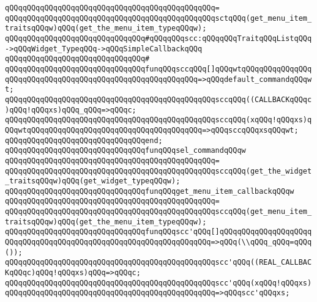 \verb|qQQqqQQqqQQqqQQqqQQqqQQqqQQqqQQqqQQqqQQqqQQqqQQq=|\newline
\verb|qQQqqQQqqQQqqQQqqQQqqQQqqQQqqQQqqQQqqQQqqQQqqQQqsctqQQq(get_menu_item_traitsqQQqw)qQQq(get_the_menu_item_typeqQQqw);|\newline
\newline
\verb|qQQqqQQqqQQqqQQqqQQqqQQqqQQqqQQq#qQQqqQQqscc:qQQqqQQqTraitqQQqListqQQq->qQQqWidget_TypeqQQq->qQQqSimpleCallbackqQQq|\newline
\verb|qQQqqQQqqQQqqQQqqQQqqQQqqQQqqQQq#|\newline
\verb|qQQqqQQqqQQqqQQqqQQqqQQqqQQqqQQqfunqQQqsccqQQq[]qQQqwtqQQqqQQqqQQqqQQqqQQqqQQqqQQqqQQqqQQqqQQqqQQqqQQqqQQqqQQqqQQq=>qQQqdefault_commandqQQqwt;|\newline
\verb|qQQqqQQqqQQqqQQqqQQqqQQqqQQqqQQqqQQqqQQqqQQqqQQqsccqQQq((CALLBACKqQQqc)qQQq!qQQqxs)qQQq_qQQq=>qQQqc;|\newline
\verb|qQQqqQQqqQQqqQQqqQQqqQQqqQQqqQQqqQQqqQQqqQQqqQQqsccqQQq(xqQQq!qQQqxs)qQQqwtqQQqqQQqqQQqqQQqqQQqqQQqqQQqqQQqqQQqqQQq=>qQQqsccqQQqxsqQQqwt;|\newline
\verb|qQQqqQQqqQQqqQQqqQQqqQQqqQQqqQQqend;|\newline
\newline
\verb|qQQqqQQqqQQqqQQqqQQqqQQqqQQqqQQqfunqQQqsel_commandqQQqw|\newline
\verb|qQQqqQQqqQQqqQQqqQQqqQQqqQQqqQQqqQQqqQQqqQQqqQQq=|\newline
\verb|qQQqqQQqqQQqqQQqqQQqqQQqqQQqqQQqqQQqqQQqqQQqqQQqsccqQQq(get_the_widget_traitsqQQqw)qQQq(get_widget_typeqQQqw);|\newline
\newline
\verb|qQQqqQQqqQQqqQQqqQQqqQQqqQQqqQQqfunqQQqget_menu_item_callbackqQQqw|\newline
\verb|qQQqqQQqqQQqqQQqqQQqqQQqqQQqqQQqqQQqqQQqqQQqqQQq=|\newline
\verb|qQQqqQQqqQQqqQQqqQQqqQQqqQQqqQQqqQQqqQQqqQQqqQQqsccqQQq(get_menu_item_traitsqQQqw)qQQq(get_the_menu_item_typeqQQqw);|\newline
\newline
\verb|qQQqqQQqqQQqqQQqqQQqqQQqqQQqqQQqfunqQQqscc'qQQq[]qQQqqQQqqQQqqQQqqQQqqQQqqQQqqQQqqQQqqQQqqQQqqQQqqQQqqQQqqQQqqQQqqQQq=>qQQq(\\qQQq_qQQq=qQQq());|\newline
\verb|qQQqqQQqqQQqqQQqqQQqqQQqqQQqqQQqqQQqqQQqqQQqqQQqscc'qQQq((REAL_CALLBACKqQQqc)qQQq!qQQqxs)qQQq=>qQQqc;|\newline
\verb|qQQqqQQqqQQqqQQqqQQqqQQqqQQqqQQqqQQqqQQqqQQqqQQqscc'qQQq(xqQQq!qQQqxs)qQQqqQQqqQQqqQQqqQQqqQQqqQQqqQQqqQQqqQQqqQQqqQQq=>qQQqscc'qQQqxs;|\newline
